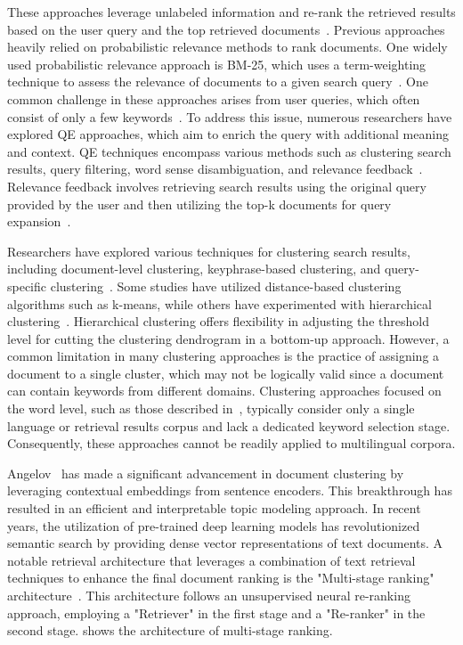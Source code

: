 These approaches leverage unlabeled information and re-rank the retrieved results based on the user query and the top retrieved documents~\cite{rohatgi2020psu, azad2019query}. Previous approaches heavily relied on probabilistic relevance methods to rank documents. One widely used probabilistic relevance approach is BM-25, which uses a term-weighting technique to assess the relevance of documents to a given search query~\cite{robertson2009probabilistic}. One common challenge in these approaches arises from user queries, which often consist of only a few keywords~\cite{azad2019query, Kankaria2015QueryET}. To address this issue, numerous researchers have explored \ac{QE} approaches, which aim to enrich the query with additional meaning and context. \ac{QE} techniques encompass various methods such as clustering search results, query filtering, word sense disambiguation, and relevance feedback~\cite{azad2019query}. Relevance feedback involves retrieving search results using the original query provided by the user and then utilizing the top-k documents for query expansion~\cite{azad2019query}.

Researchers have explored various techniques for clustering search results, including document-level clustering, keyphrase-based clustering, and query-specific clustering~\cite{bernardini2009full, kurland2008rank, zamir1998web, osinski2005concept, liu2004cluster, liu2006representing}. Some studies have utilized distance-based clustering algorithms such as k-means, while others have experimented with hierarchical clustering~\cite{bernardini2009full, mehlitz2007new, yuan2022measurement}. Hierarchical clustering offers flexibility in adjusting the threshold level for cutting the clustering dendrogram in a bottom-up approach. However, a common limitation in many clustering approaches is the practice of assigning a document to a single cluster, which may not be logically valid since a document can contain keywords from different domains. Clustering approaches focused on the word level, such as those described in~\cite{bernardini2009full, mehlitz2007new}, typically consider only a single language or retrieval results corpus and lack a dedicated keyword selection stage. Consequently, these approaches cannot be readily applied to multilingual corpora.

Angelov~\cite{angelov2020top2vec} has made a significant advancement in document clustering by leveraging contextual embeddings from sentence encoders. This breakthrough has resulted in an efficient and interpretable topic modeling approach. In recent years, the utilization of pre-trained deep learning models has revolutionized semantic search by providing dense vector representations of text documents. A notable retrieval architecture that leverages a combination of text retrieval techniques to enhance the final document ranking is the "Multi-stage ranking" architecture~\cite{yates2021pretrained, anand2021serverless, nogueira2019passage}. This architecture follows an unsupervised neural re-ranking approach, employing a "Retriever" in the first stage and a "Re-ranker" in the second stage.  shows the architecture of multi-stage ranking. 

